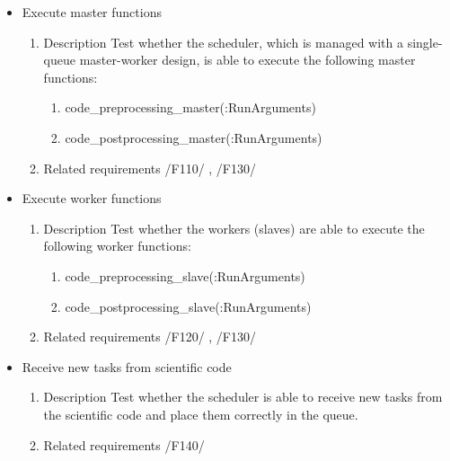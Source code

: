 {\begin{itemize}
				\item Execute master functions
				\begin{enumerate}
						\item Description\newline
Test whether the scheduler, which is managed with a single-queue master-worker design, is able to execute the following master functions: 
					\begin{enumerate}
\item code\_preprocessing\_master(:RunArguments)
						\item code\_postprocessing\_master(:RunArguments)
					\end{enumerate}
						\item Related requirements\newline
 							  /F110/	, /F130/	
				\end{enumerate}
				
				
				
				\item Execute worker functions
				\begin{enumerate}
						\item Description\newline
Test whether the workers (slaves) are able to execute the following worker functions: 
					\begin{enumerate}
						\item code\_preprocessing\_slave(:RunArguments)
						\item code\_postprocessing\_slave(:RunArguments)
					\end{enumerate}
						\item Related requirements\newline
 							  /F120/	, /F130/
				\end{enumerate}
				
				
				\item Receive new tasks from scientific code
				\begin{enumerate}
					\item Description\newline
Test whether the scheduler is able to receive new tasks from the scientific code and place them correctly in the queue.
					\item Related requirements\newline
						/F140/
				\end{enumerate}
				
				
				

\end{itemize}}
